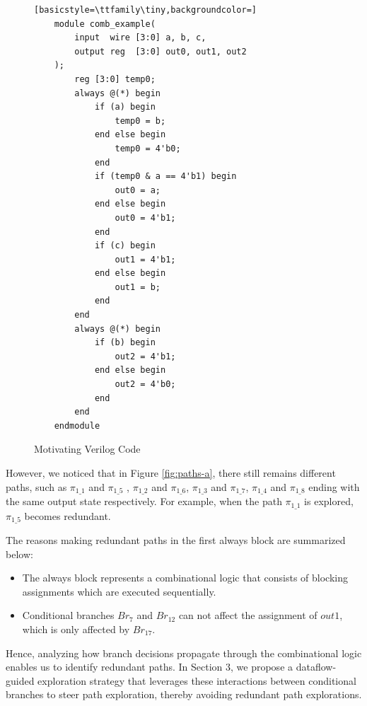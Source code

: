 \documentclass[conference]{IEEEtran}
\begin{document}
\begin{figure}[h!]
\begin{framed}
    \begin{lstlisting}[basicstyle=\ttfamily\tiny,backgroundcolor=]
    module comb_example(
        input  wire [3:0] a, b, c,
        output reg  [3:0] out0, out1, out2
    );
        reg [3:0] temp0;
        always @(*) begin
            if (a) begin
                temp0 = b;
            end else begin
                temp0 = 4'b0;
            end
            if (temp0 & a == 4'b1) begin
                out0 = a;
            end else begin
                out0 = 4'b1;
            end
            if (c) begin
                out1 = 4'b1;
            end else begin
                out1 = b;
            end
        end
        always @(*) begin
            if (b) begin
                out2 = 4'b1;
            end else begin
                out2 = 4'b0;
            end
        end
    endmodule
    \end{lstlisting}
\end{framed}
\caption{Motivating Verilog Code}
\label{fig:verilog-fig}
\vspace{-20pt}
\end{figure}


However, we noticed that in Figure \ref{fig:paths-a}, there still remains different paths, such as $\pi_{1\_1}$ and $\pi_{1\_5}$ , $\pi_{1\_2}$ and $\pi_{1\_6}$, $\pi_{1\_3}$ and $\pi_{1\_7}$, $\pi_{1\_4}$ and $\pi_{1\_8}$ ending with the same output state respectively. For example, when the path $\pi_{1\_1}$ is explored, $\pi_{1\_5}$ becomes redundant. 

The reasons making redundant paths in the first always block are summarized below:
\begin{itemize}
    \item The always block represents a combinational logic that consists of blocking assignments which are executed sequentially.
    \item Conditional branches $Br_7$ and $Br_{12}$ can not affect the assignment of $out1$, which is only affected by $Br_{17}$. %
\end{itemize}

Hence, analyzing how branch decisions propagate through the combinational logic enables us to identify redundant paths. In Section 3,  we propose a dataflow-guided exploration strategy that leverages these interactions between conditional branches to steer path
exploration, thereby avoiding redundant path explorations.
\end{document}
